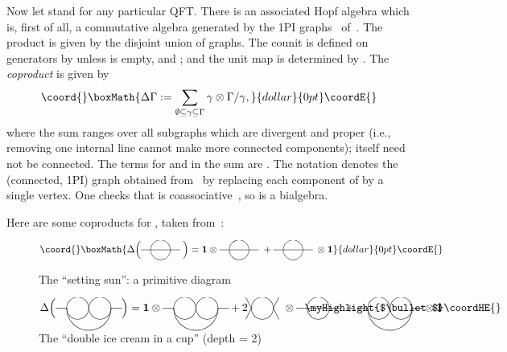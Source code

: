 \documentclass[a4paper,12pt]{article}
\providecommand{\Dl}{\Delta}            %
\providecommand{\eps}{\varepsilon}      %
\providecommand{\Ga}{\Gamma}            %
\providecommand{\ga}{\gamma}            %
\providecommand{\ox}{\otimes}           %
\providecommand{\1}{\mathbf{1}}         %
\providecommand{\7}{\dagger}            %
\providecommand{\8}{\bullet}            %
\renewcommand{\.}{\cdot}            %
\renewcommand{\:}{\colon}           %
\providecommand{\sunset}{%
\parbox{15mm}{\begin{picture}(20,10)
\put(0,5){\line(1,0){10}}
\put(20,5){\circle{20}}
\put(10,5){\line(1,0){30}}
\end{picture}}
}
\providecommand{\iice}{%
\parbox{21mm}{\begin{picture}(20,10)
\put(0,5){\line(1,0){10}}
\put(20,5){\circle{20}}
\put(40.2,5){\circle{20}}
\put(30.2,5){\oval(40.5,40)[bl]}
\put(30.2,5){\oval(40,40)[br]}
\put(50.2,5){\line(1,0){10}}
\end{picture}}
}
\providecommand{\sweet}{%
\parbox{10mm}{\begin{picture}(20,10)
\put(0,5){\line(-1,2){5}}
\put(0,5){\line(-1,-2){5}}
\put(10,5){\circle{20}}
\put(20,5){\line(1,2){5}}
\put(20,5){\line(1,-2){5}}
\end{picture}}
}
\begin{document}
Now let \myHighlight{$\Phi$}\coordHE{} stand for any particular QFT. There is an associated
Hopf algebra \coordHE{} \cite{ConnesKrRHI,ConnesKrRHII} which is, first
of all, a commutative algebra generated by the 1PI graphs~\myHighlight{$\Ga$}\coordHE{}
of~\myHighlight{$\Phi$}\coordHE{}. The product is given by the disjoint union of graphs. The
counit \myHighlight{$\eps$}\coordHE{} is defined on generators by \myHighlight{$\eps(\Ga) := 0$}\coordHE{} unless
\myHighlight{$\Ga$}\coordHE{} is empty, and \myHighlight{$\eps(\emptyset) := 1$}\coordHE{}; and the unit map \myHighlight{$\eta$}\coordHE{} is
determined by \coordHE{}. The \textit{coproduct} \myHighlight{$\Dl$}\coordHE{} is
given by
$$\coord{}\boxMath{
\Dl\Ga := \sum_{\emptyset\subseteq\ga\subseteq\Ga} \ga \ox \Ga/\ga,
}{dollar}{0pt}\coordE{}$$
where the sum ranges over all subgraphs \myHighlight{$\ga$}\coordHE{} which are divergent and
proper (i.e., removing one internal line cannot make more connected
components); \myHighlight{$\ga$}\coordHE{} itself need not be connected. The terms for
\myHighlight{$\ga = \emptyset$}\coordHE{} and \myHighlight{$\ga = \Ga$}\coordHE{} in the sum are
\myHighlight{$\Ga \ox 1 + 1 \ox \Ga$}\coordHE{}. The notation \myHighlight{$\Ga/\ga$}\coordHE{} denotes the
(connected, 1PI) graph obtained from~\myHighlight{$\Ga$}\coordHE{} by replacing each component
of \myHighlight{$\ga$}\coordHE{} by a single vertex. One checks that \myHighlight{$\Dl$}\coordHE{} is
coassociative~\cite{ConnesKrRHI}, so \coordHE{} is a bialgebra.


Here are some coproducts for \coordHE{}, taken 
from~\cite{Etoile}:

\begin{figure}[ht]
\centering
$$\coord{}\boxMath{
\Dl \Bigl( \sunset \Bigr) = \1 \ox \sunset + \sunset \ox \1
}{dollar}{0pt}\coordE{}$$
\caption{The ``setting sun'': a primitive diagram\coordHE{}}
\label{fig:sunset}
\end{figure}


\begin{figure}[ht]
\centering
$$
\Dl \Bigl( \iice \Bigr) = 
\1 \ox \iice + 2\ \sweet \ox \sunset \put(-35,0){\myHighlight{$\bullet$}\coordHE{}}
+ \iice \ox \1
$$
\caption{The ``double ice cream in a cup'' (depth = 2)}
\label{fig:icecream}
\end{figure}
\end{document}
